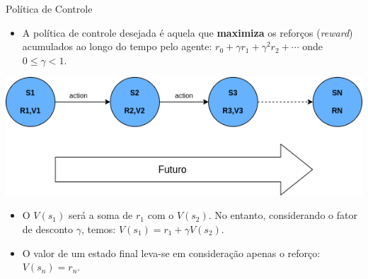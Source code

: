 \documentclass{beamer}
\begin{document}
\begin{frame}{Política de Controle}
	\begin{itemize}
	\item A política de controle desejada é aquela que \textbf{maximiza} os reforços 
	(\textit{reward}) acumulados ao longo do tempo pelo 
	agente: $r_{0} + \gamma r_{1} + \gamma^{2} r_{2} + \cdots $ onde $0 \leq \gamma < 1$.
	\end{itemize}


  \begin{center}
	\includegraphics[width=.7\textwidth]{figuras/sequencia_futuro.png}
\end{center}

\pause

\begin{itemize}
	\item O $V(s_{1})$ será a soma de $r_{1}$ com o $V(s_{2})$. No entanto, considerando 
	o fator de desconto $\gamma$, temos: $V(s_{1}) = r_{1} + \gamma V(s_{2}) $.
	
	\item O valor de um estado final leva-se em consideração apenas o 
	reforço: $V(s_{n}) = r_{n}$.
	
\end{itemize}
\end{frame}
\end{document}
